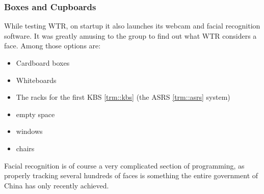 \subsubsection{Boxes and Cupboards}
While testing WTR, on startup it also launches its webcam and facial recognition software.
It was greatly amusing to the group to find out what WTR considers a face.
Among those options are:
\begin{itemize}
\item Cardboard boxes
\item Whiteboards
\item The racks for the first KBS \ref{trm::kbs} (the ASRS \ref{trm::asrs} system)
\item empty space
\item windows
\item chairs
\end{itemize}
Facial recognition is of course a very complicated section of programming, as properly tracking several hundreds of faces is something the entire government of China has only recently achieved.

